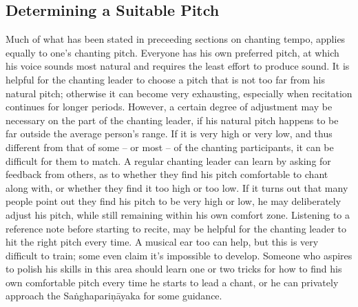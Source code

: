 \subsection*{Determining a Suitable Pitch}
\begin{justify}
  Much of what has been stated in preceeding sections on chanting tempo, applies equally to one's chanting pitch. Everyone has his own preferred pitch, at which his voice sounds most natural and requires the least effort to produce sound. It is helpful for the chanting leader to choose a pitch that is not too far from his natural pitch; otherwise it can become very exhausting, especially when recitation continues for longer periods. However, a certain degree of adjustment may be necessary on the part of the chanting leader, if his natural pitch happens to be far outside the average person's range. If it is very high or very low, and thus different from that of some -- or most -- of the chanting participants, it can be difficult for them to match. A regular chanting leader can learn by asking for feedback from others, as to whether they find his pitch comfortable to chant along with, or whether they find it too high or too low. If it turns out that many people point out they find his pitch to be very high or low, he may deliberately adjust his pitch, while still remaining within his own comfort zone. Listening to a reference note before starting to recite, may be helpful for the chanting leader to hit the right pitch every time. A musical ear too can help, but this is very difficult to train; some even claim it's impossible to develop. Someone who aspires to polish his skills in this area should learn one or two tricks for how to find his own comfortable pitch every time he starts to lead a chant, or he can privately approach the Saṅghapariṇāyaka for some guidance.
\end{justify}

